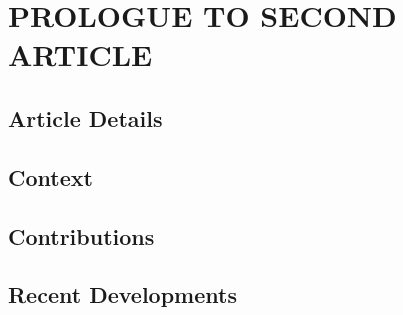 \chapter{PROLOGUE TO SECOND ARTICLE}


\section{Article Details}


\section{Context}


\section{Contributions}


\section{Recent Developments}
